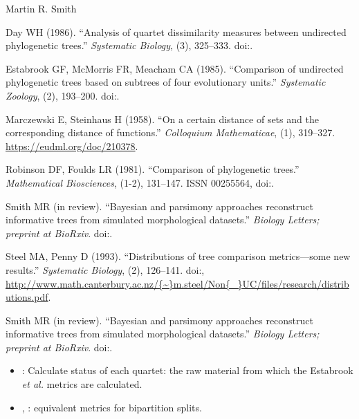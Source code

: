 \documentclass[a4paper]{book}
\begin{document}
%
\begin{Author}\relax
Martin R. Smith
\end{Author}
%
\begin{References}\relax
Day WH (1986).
``Analysis of quartet dissimilarity measures between undirected phylogenetic trees.''
\emph{Systematic Biology}, (3), 325--333.
doi:\nobreakspace{}.

Estabrook GF, McMorris FR, Meacham CA (1985).
``Comparison of undirected phylogenetic trees based on subtrees of four evolutionary units.''
\emph{Systematic Zoology}, (2), 193--200.
doi:\nobreakspace{}.

Marczewski E, Steinhaus H (1958).
``On a certain distance of sets and the corresponding distance of functions.''
\emph{Colloquium Mathematicae}, (1), 319--327.
\url{https://eudml.org/doc/210378}.

Robinson DF, Foulds LR (1981).
``Comparison of phylogenetic trees.''
\emph{Mathematical Biosciences}, (1-2), 131--147.
ISSN 00255564, doi:\nobreakspace{}.

Smith MR (in review).
``Bayesian and parsimony approaches reconstruct informative trees from simulated morphological datasets.''
\emph{Biology Letters; preprint at BioRxiv}.
doi:\nobreakspace{}.

Steel MA, Penny D (1993).
``Distributions of tree comparison metrics---some new results.''
\emph{Systematic Biology}, (2), 126--141.
doi:\nobreakspace{}, \url{http://www.math.canterbury.ac.nz/{~}m.steel/Non{\_}UC/files/research/distributions.pdf}.

Smith MR (in review).
``Bayesian and parsimony approaches reconstruct informative trees from simulated morphological datasets.''
\emph{Biology Letters; preprint at BioRxiv}.
doi:\nobreakspace{}.
\end{References}
%
\begin{SeeAlso}\relax
\begin{itemize}

\item {}: Calculate status of each quartet: the raw material
from which the Estabrook \emph{et al.} metrics are calculated.
\item {}, : equivalent metrics for bipartition splits.

\end{itemize}

\end{SeeAlso}
\end{document}

